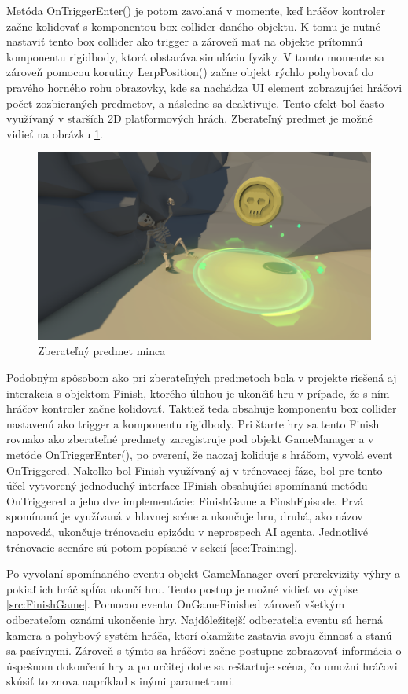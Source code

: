 \documentclass[slovak, master]{diploma}
\begin{document}
Metóda OnTriggerEnter() je potom zavolaná v momente, keď hráčov kontroler začne kolidovať s komponentou box collider daného objektu. K tomu je nutné nastaviť tento box collider ako trigger a zároveň mať na objekte prítomnú komponentu rigidbody, ktorá obstaráva simuláciu fyziky. V tomto momente sa zároveň pomocou korutiny LerpPosition() začne objekt rýchlo pohybovať do pravého horného rohu obrazovky, kde sa nachádza UI element zobrazujúci hráčovi počet zozbieraných predmetov, a následne sa deaktivuje. Tento efekt bol často využívaný v starších 2D platformových hrách. Zberateľný predmet je možné vidieť na obrázku \ref{pic:Pickup}.

\begin{figure}[!htbp]
	\centering
	\includegraphics[width=.9\textwidth]{Figures/pickup.png}
	\caption{Zberateľný predmet minca}
	\label{pic:Pickup}
\end{figure}

Podobným spôsobom ako pri zberateľných predmetoch bola v projekte riešená aj interakcia s objektom Finish, ktorého úlohou je ukončiť hru v prípade, že s ním hráčov kontroler začne kolidovať. Taktiež teda obsahuje komponentu box collider nastavenú ako trigger a komponentu rigidbody. Pri štarte hry sa tento Finish rovnako ako zberateľné predmety zaregistruje pod objekt GameManager a v metóde \mbox{OnTriggerEnter()}, po overení, že naozaj koliduje s hráčom, vyvolá event \mbox{OnTriggered}. Nakoľko bol Finish využívaný aj v trénovacej fáze, bol pre tento účel vytvorený jednoduchý interface IFinish obsahujúci spomínanú metódu OnTriggered a jeho dve implementácie: FinishGame a FinshEpisode. Prvá spomínaná je využívaná v hlavnej scéne a ukončuje hru, druhá, ako názov napovedá, ukončuje trénovaciu epizódu v neprospech AI agenta. Jednotlivé trénovacie scenáre sú potom popísané v sekcií \ref{sec:Training}.

Po vyvolaní spomínaného eventu objekt GameManager overí prerekvizity výhry a pokiaľ ich hráč spĺňa ukončí hru. Tento postup je možné vidieť vo výpise \ref{src:FinishGame}. Pomocou eventu OnGameFinished zároveň všetkým odberateľom oznámi ukončenie hry. Najdôležitejší odberatelia eventu sú herná kamera a pohybový systém hráča, ktorí okamžite zastavia svoju činnosť a stanú sa pasívnymi. Zároveň s týmto sa hráčovi začne postupne zobrazovať informácia o úspešnom dokončení hry a po určitej dobe sa reštartuje scéna, čo umožní hráčovi skúsiť to znova napríklad s inými parametrami.
\end{document}
